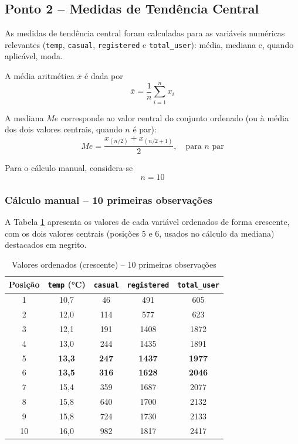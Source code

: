 \documentclass[10pt, a4paper]{article}
\begin{document}
\subsection{Ponto 2 -- Medidas de Tendência Central}

As medidas de tendência central foram calculadas para as variáveis numéricas relevantes (\texttt{temp}, \texttt{casual}, \texttt{registered} e \texttt{total\_user}): média, mediana e, quando aplicável, moda.

A média aritmética $\bar{x}$ é dada por
\[
\bar{x} = \frac{1}{n}\sum_{i=1}^{n} x_i
\]

A mediana $Me$ corresponde ao valor central do conjunto ordenado (ou à média dos dois valores centrais, quando $n$ é par):
\[
Me = \frac{x_{(n/2)} + x_{(n/2+1)}}{2}, \quad \text{para } n \text{ par}
\]

Para o cálculo manual, considera-se
\[
n = 10
\]

\subsubsection{Cálculo manual -- 10 primeiras observações}

A Tabela \ref{tab:valores-ordenados-10} apresenta os valores de cada variável ordenados de forma crescente, com os dois valores centrais (posições 5 e 6, usados no cálculo da mediana) destacados em negrito.

\begin{table}[h]
\centering
\caption{Valores ordenados (crescente) -- 10 primeiras observações}
\label{tab:valores-ordenados-10}
\begin{tabular}{ccccc}
\hline
\textbf{Posição} & \texttt{temp} (°C) & \texttt{casual} & \texttt{registered} & \texttt{total\_user} \\
\hline
1  & 10,7 & 46  & 491  & 605  \\
2  & 12,0 & 114 & 577  & 623  \\
3  & 12,1 & 191 & 1408 & 1872 \\
4  & 13,0 & 244 & 1435 & 1891 \\
5  & \textbf{13,3} & \textbf{247} & \textbf{1437} & \textbf{1977} \\
6  & \textbf{13,5} & \textbf{316} & \textbf{1628} & \textbf{2046} \\
7  & 15,4 & 359 & 1687 & 2077 \\
8  & 15,8 & 640 & 1700 & 2132 \\
9  & 15,8 & 724 & 1730 & 2133 \\
10 & 16,0 & 982 & 1817 & 2417 \\
\hline
\end{tabular}
\end{table}
\end{document}
